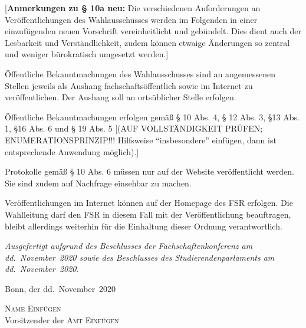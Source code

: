 \documentclass[%
draft,%
multilinesections%
]{fswo}
\newcommand\bemFr[1]{{\color{Red}[#1]}}
\newcommand\bemFr[1]{}%
\begin{document}
\bemFr{\textbf{Anmerkungen zu § 10a neu:}
Die verschiedenen Anforderungen an Veröffentlichungen des Wahlausschusses werden im Folgenden in einer einzufügenden neuen Vorschrift vereinheitlicht und gebündelt.
Dies dient auch der Lesbarkeit und Verständlichkeit, zudem können etwaige Änderungen so zentral und weniger bürokratisch umgesetzt werden.}

\begin{contract}
Öffentliche Bekanntmachungen des Wahlausschusses sind an angemessenen Stellen jeweils als Aushang fachschaftsöffentlich sowie im Internet zu veröffentlichen.
Der Aushang soll an ortsüblicher Stelle erfolgen.

Öffentliche Bekanntmachungen erfolgen gemäß § 10 Abs. 4, § 12 Abs. 3, §13 Abs. 1, §16 Abs. 6 und § 19 Abs. 5 \bemFr{(AUF VOLLSTÄNDIGKEIT PRÜFEN; ENUMERATIONSPRINZIP!!! Hilfsweise \enquote{insbesondere} einfügen, dann ist entsprechende Anwendung möglich).}

Protokolle gemäß § 10 Abs. 6 müssen nur auf der Website veröffentlicht werden.
Sie sind zudem auf Nachfrage einsehbar zu machen.

Veröffentlichungen im Internet können auf der Homepage des FSR erfolgen.
Die Wahlleitung darf den FSR in diesem Fall mit der Veröffentlichung beauftragen, bleibt allerdings weiterhin für die Einhaltung dieser Ordnung verantwortlich.

\end{contract}


\vspace{2em}
{\itshape%
Ausgefertigt aufgrund des Beschlusses der Fachschaftenkonferenz am dd.~November~2020 sowie des Beschlusses des Studierendenparlaments am dd.~November~2020.

Bonn, der dd.~November~2020}
\vspace{1em}
\begin{center}
\textsc{Name Einfügen}\\
Vorsitzender der \textsc{Amt Einfügen}
\end{center}
\end{document}
